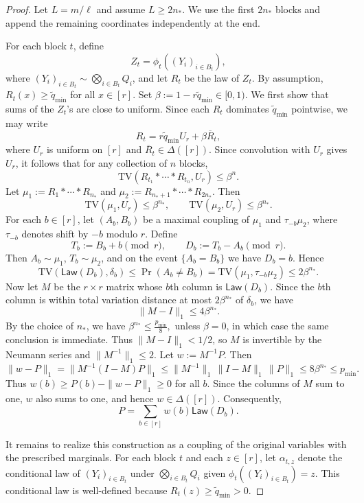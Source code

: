 \documentclass[journal]{IEEEtran}
\newcommand{\TV}{\mathrm{TV}}
\newcommand{\1}{\mathbf{1}}
\begin{document}
\begin{proof}
Let $L=m/\ell$ and assume $L\ge 2n_*$. We use the first $2n_*$ blocks and append the remaining coordinates independently at the end.

For each block $t$, define
$$
Z_t=\phi_t((Y_i)_{i\in B_t}),
$$
where $(Y_i)_{i\in B_t}\sim\bigotimes_{i\in B_t}Q_i$, and let $R_t$ be the law of $Z_t$. By assumption,
$R_t(x)\ge \widetilde q_{\min}$ for all $x\in[r]$.
Set $\beta:=1-r\widetilde q_{\min}\in[0,1).$
We first show that sums of the $Z_t$'s are close to uniform. Since each $R_t$ dominates $\widetilde q_{\min}$ pointwise, we may write
$$R_t=r\widetilde q_{\min} U_r+\beta \overline R_t,$$
where $U_r$ is uniform on $[r]$ and $\overline R_t\in\Delta([r])$. Since convolution with $U_r$ gives $U_r$, it follows that for any collection of $n$ blocks,
$$
\TV(R_{t_1}*\cdots*R_{t_n},U_r)\le \beta^n.
$$
Let $\mu_1:=R_1*\cdots*R_{n_*}$ and  $\mu_2:=R_{n_*+1}*\cdots*R_{2n_*}.$
Then
$$
\TV(\mu_1,U_r)\le \beta^{n_*},
\qquad
\TV(\mu_2,U_r)\le \beta^{n_*}.
$$
For each $b\in[r]$, let $(A_b,B_b)$ be a maximal coupling of $\mu_1$ and $\tau_{-b}\mu_2$, where $\tau_{-b}$ denotes shift by $-b$ modulo $r$. Define
$$
T_b:=B_b+b \pmod r,
\qquad
D_b:=T_b-A_b \pmod r.
$$
Then $A_b\sim\mu_1$, $T_b\sim\mu_2$, and on the event $\{A_b=B_b\}$ we have $D_b=b$. Hence
$$
\TV(\mathsf{Law}(D_b),\delta_b)
\le
\Pr(A_b\ne B_b)
=
\TV(\mu_1,\tau_{-b}\mu_2)
\le
2\beta^{n_*}.
$$
Now let $M$ be the $r\times r$ matrix whose $b$th column is $\mathsf{Law}(D_b)$. Since the $b$th column is within total variation distance at most $2\beta^{n_*}$ of $\delta_b$, we have
$$
\|M-I\|_1\le 4\beta^{n_*}.
$$
By the choice of $n_*$, we have $\beta^{n_*}\leq \frac{p_{\min}}{8},$
unless $\beta=0$, in which case the same conclusion is immediate. Thus $\|M-I\|_1<1/2$, so $M$ is invertible by the Neumann series and
$\|M^{-1}\|_1\le 2.$
Let $w:=M^{-1}P$. Then
$$
\|w-P\|_1
=
\|M^{-1}(I-M)P\|_1
\le
\|M^{-1}\|_1\,\|I-M\|_1\,\|P\|_1
\le
8\beta^{n_*}
\leq 
p_{\min}.
$$
Thus $w(b)\ge P(b)-\|w-P\|_1\ge0$ for all $b$. Since the columns of $M$ sum to one, $w$ also sums to one, and hence $w\in\Delta([r])$. Consequently,
$$
P=\sum_{b\in[r]}w(b)\mathsf{Law}(D_b).
$$

It remains to realize this construction as a coupling of the original variables with the prescribed marginals. For each block $t$ and each $z\in[r]$, let $\alpha_{t,z}$ denote the conditional law of $(Y_i)_{i\in B_t}$ under $\bigotimes_{i\in B_t}Q_i$ given $\phi_t((Y_i)_{i\in B_t})=z$. This conditional law is well-defined because $R_t(z)\ge \widetilde q_{\min}>0$.


\end{proof}
\end{document}
